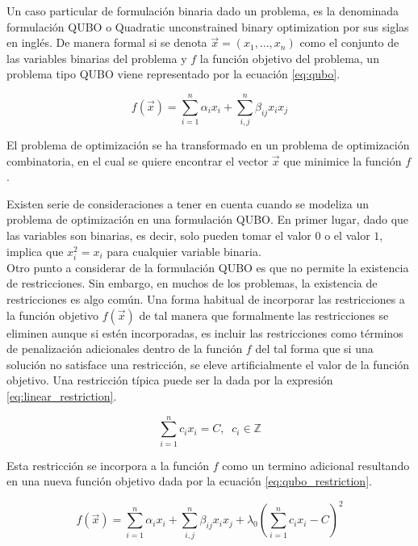 Un caso particular de formulación binaria dado un problema, es la denominada formulación QUBO o Quadratic unconstrained binary optimization  por sus siglas en inglés. De manera formal si se denota $\Vec{x} = (x_{1}, ..., x_{n})$ como el conjunto de las variables binarias del problema y $f$ la función objetivo del problema, un problema tipo QUBO viene representado por la ecuación \ref{eq:qubo}.

\begin{equation}
    f(\Vec{x}) = \sum_{i=1}^{n} \alpha_{i} x_{i} + \sum_{i,j}^{n} \beta_{ij} x_{i} x_{j}
    \label{eq:qubo}
\end{equation}


El problema de optimización se ha transformado en un problema de optimización combinatoria, en el cual se quiere encontrar el vector $\Vec{x}$ que minimice la función $f$.

\newpage

Existen serie de consideraciones a tener en cuenta cuando se modeliza un problema de optimización en una formulación QUBO. En primer lugar, dado que las variables son binarias, es decir, solo pueden tomar el valor $0$ o el valor $1$, implica que $x_{i}^{2} = x_{i}$ para cualquier variable binaria. \\

Otro punto a considerar de la formulación QUBO es que no permite la existencia de restricciones. Sin embargo, en muchos de los problemas, la existencia de restricciones es algo común. Una forma habitual de incorporar las restricciones a la función objetivo $f(\Vec{x})$ de tal manera que formalmente las restricciones se eliminen aunque si estén incorporadas, es incluir las restricciones como términos de penalización adicionales dentro de la función $f$ del tal forma que si una solución no satisface una restricción, se eleve artificialmente el valor de la función objetivo. Una restricción típica puede ser la dada por la expresión \ref{eq:linear_restriction}.

\begin{equation}
    \sum_{i=1}^{n}c_ix_i = C, \; \; c_i \in \mathbb{Z} 
    \label{eq:linear_restriction}
\end{equation}

Esta restricción se incorpora a la función $f$ como un termino adicional resultando en una nueva función objetivo dada por la ecuación \ref{eq:qubo_restriction}.

\begin{equation}
    f(\Vec{x}) = \sum_{i=1}^{n} \alpha_{i} x_{i} + \sum_{i,j}^{n} \beta_{ij} x_{i} x_{j} + \lambda_0(\sum_{i=1}^n c_ix_i-C)^2
    \label{eq:qubo_restriction}
\end{equation}

